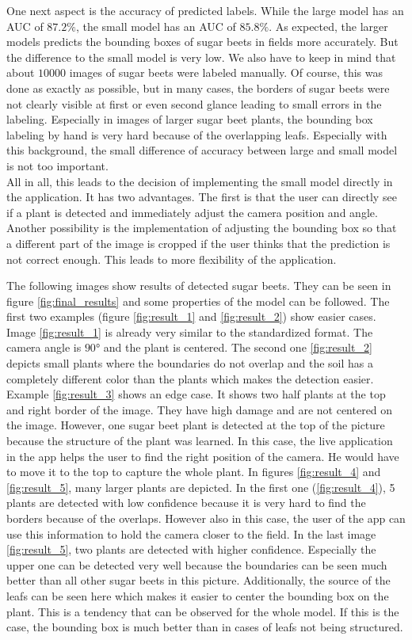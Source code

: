 One next aspect is the accuracy of predicted labels. While the large model has an AUC of $ 87.2\% $, the small model has an AUC of $ 85.8\% $. As expected, the larger models predicts the bounding boxes of sugar beets in fields more accurately. But the difference to the small model is very low. We also have to keep in mind that about $ 10000 $ images of sugar beets were labeled manually. Of course, this was done as exactly as possible, but in many cases, the borders of sugar beets were not clearly visible at first or even second glance leading to small errors in the labeling. Especially in images of larger sugar beet plants, the bounding box labeling by hand is very hard because of the overlapping leafs. Especially with this background, the small difference of accuracy between large and small model is not too important.\\

All in all, this leads to the decision of implementing the small model directly in the application. It has two advantages. The first is that the user can directly see if a plant is detected and immediately adjust the camera position and angle. Another possibility is the implementation of adjusting the bounding box so that a different part of the image is cropped if the user thinks that the prediction is not correct enough. This leads to more flexibility of the application. 

The following images show results of detected sugar beets. They can be seen in figure \ref{fig:final_results} and some properties of the model can be followed. The first two examples (figure \ref{fig:result_1} and \ref{fig:result_2}) show easier cases. Image \ref{fig:result_1} is already very similar to the standardized format. The camera angle is $ 90° $ and the plant is centered. The second one \ref{fig:result_2} depicts small plants where the boundaries do not overlap and the soil has a completely different color than the plants which makes the detection easier. Example \ref{fig:result_3} shows an edge case. It shows two half plants at the top and right border of the image. They have high damage and are not centered on the image. However, one sugar beet plant is detected at the top of the picture because the structure of the plant was learned. In this case, the live application in the app helps the user to find the right position of the camera. He would have to move it to the top to capture the whole plant. In figures \ref{fig:result_4} and \ref{fig:result_5}, many larger plants are depicted. In the first one (\ref{fig:result_4}), 5 plants are detected with low confidence because it is very hard to find the borders because of the overlaps. However also in this case, the user of the app can use this information to hold the camera closer to the field. In the last image \ref{fig:result_5}, two plants are detected with higher confidence. Especially the upper one can be detected very well because the boundaries can be seen much better than all other sugar beets in this picture. Additionally, the source of the leafs can be seen here which makes it easier to center the bounding box on the plant. This is a tendency that can be observed for the whole model. If this is the case, the bounding box is much better than in cases of leafs not being structured.

